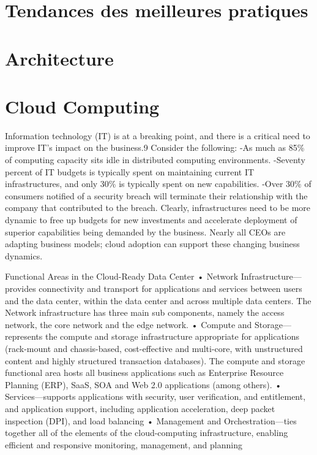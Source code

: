 \section{Tendances des meilleures pratiques}


\section{Architecture}

\section{Cloud Computing}

Information technology (IT) is at a breaking point, and there is a critical need to improve IT's impact on the business.9
Consider the following:
 -As much as 85\% of computing capacity sits idle in distributed computing environments.
 -Seventy percent of IT budgets is typically spent on maintaining current IT infrastructures, and only 30\% is typically spent on new capabilities.
 -Over 30\% of consumers notified of a security breach will terminate their relationship with the company that contributed to the breach.
Clearly, infrastructures need to be more dynamic to free up budgets for new investments and accelerate deployment of superior capabilities being demanded by the business. Nearly all CEOs are adapting business models; cloud adoption can support these changing business dynamics.

Functional Areas in the Cloud-Ready Data Center
• Network Infrastructure—provides connectivity and transport for applications and services between users and the data center, within the data center and across multiple data centers. The Network infrastructure has three main sub components, namely the access network, the core network and the edge network.
• Compute and Storage—represents the compute and storage infrastructure appropriate for applications (rack-mount and chassis-based, cost-effective and multi-core, with unstructured content and highly structured transaction databases). The compute and storage functional area hosts all business applications such as Enterprise Resource Planning (ERP), SaaS, SOA and Web 2.0 applications (among others).
• Services—supports applications with security, user verification, and entitlement, and application support, including application acceleration, deep packet inspection (DPI), and load balancing
• Management and Orchestration—ties together all of the elements of the cloud-computing infrastructure, enabling efficient and responsive monitoring, management, and planning


